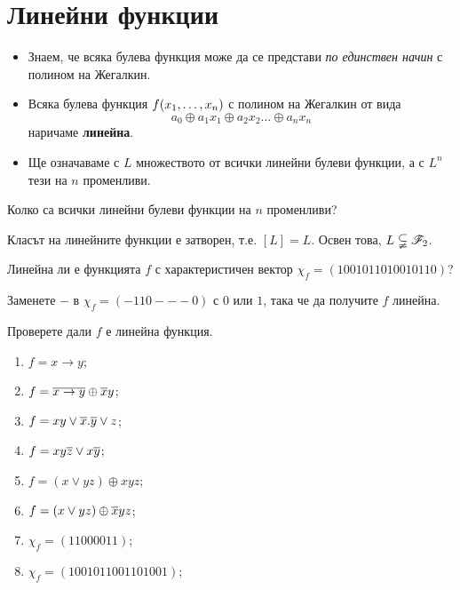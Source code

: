 \section{Линейни функции}

\begin{itemize}
\item
  Знаем, че всяка булева функция може да се представи {\em по единствен начин}
  с полином на Жегалкин.
\item
  Всяка булева функция $f(x_{1},\dots,x_{n})$ с полином на Жегалкин от вида 
  \[a_0\oplus a_1x_1 \oplus a_2x_2 \dots\oplus a_nx_n\] наричаме {\bf линейна}.
\item
  Ще означаваме с $L$ множеството от всички линейни булеви функции, а с $L^n$ тези на $n$ променливи.
\end{itemize}

\begin{problem}
  Колко са всички линейни булеви функции на $n$ променливи?
\end{problem}


\begin{prop}
  Класът на линейните функции е затворен, т.е. $[L] = L$.
  Освен това, $L \subsetneqq \mathscr{F}_2$.
\end{prop}


\begin{problem}
  Линейна ли е функцията $f$ с характеристичен вектор $\chi_f = (1001011010010110)$?
\end{problem}

\begin{problem}
  Заменете $-$ в $\chi_f = (-110---0)$ с $0$ или $1$, така че да получите $f$ линейна.
\end{problem}


\begin{problem}
  Проверете дали $f$ е линейна функция.
  \begin{enumerate}
  \item
    $f = x\rightarrow y$;
  \item
    $f = \overline{x\rightarrow y}\oplus \overline{x}y$;
  \item
    $f = xy\vee \overline{x}.\overline{y}\vee z$;
  \item
    $f = xy\overline{z}\vee x\overline{y}$;
  \item
    $f = (x\vee yz)\oplus xyz$;
  \item
    $f = (x\vee yz)\oplus \overline{x}yz$;
  \item
    $\chi_f = (1100 0011)$;
  \item
    $\chi_f = (1001 0110 0110 1001)$;
  \end{enumerate}
\end{problem}


